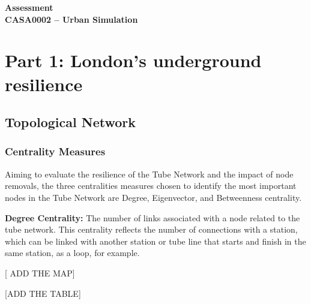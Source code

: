 \documentclass[10pt]{report}
\author{Felipe Santos Almeida}
\numberwithin{figure}{section}
\numberwithin{table}{section}
\begin{document}

\begin{center}
    \vspace*{-3cm}
\end{center}   
    {\LARGE\textbf{Assessment\\
    CASA0002 – Urban Simulation\\}}
    

\section{Part 1: London’s underground resilience}


 \subsection{Topological Network}
\subsubsection{Centrality Measures } 
        
         Aiming to evaluate the resilience of the Tube Network and the impact of node removals, the three centralities measures chosen to identify the most important nodes in the Tube Network are Degree, Eigenvector, and Betweenness centrality.
        
        \vspace{5mm} %
        
        \textbf{Degree Centrality:} The number of links associated with a node related to the tube network. This centrality reflects the number of connections with a station, which can be linked with another station or tube line that starts and finish in the same station, as a loop, for example. 

        [ ADD THE MAP]

        [ADD THE TABLE]

        
  \vspace{5mm} %
        
\end{document}
